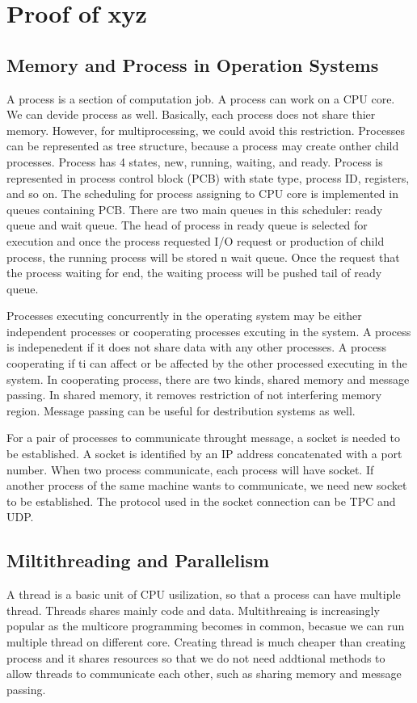 \chapter{Proof of xyz}
\label{appendix}
\thispagestyle{myheadings}

\section{Memory and Process in Operation Systems}
\label{sec:history}
A process is a section of computation job. A process can work on a CPU core. We can devide process as well.
Basically, each process does not share thier memory. However, for multiprocessing, we could avoid this restriction.
Processes can be represented as tree structure, because a process may create onther child processes.
Process has 4 states, new, running, waiting, and ready. 
Process is represented in process control block (PCB) with state type, process ID, registers, and so on.
The scheduling for process assigning to CPU core is implemented in queues containing PCB. There are two main queues in this scheduler: 
ready queue and wait queue. The head of process in ready queue is selected for execution and once the process requested I/O request or 
production of child process, the running process will be stored n wait queue. Once the request that the process waiting for end, 
the waiting process will be pushed tail of ready queue. 

Processes executing concurrently in the operating system may be either independent processes or cooperating processes excuting in the system.
A process is indepenedent if it does not share data with any other processes. A process cooperating if ti can affect or be affected by the 
other processed executing in the system. In cooperating process, there are two kinds, shared memory and message passing. 
In shared memory, it removes restriction of not interfering memory region. Message passing can be useful for destribution systems as well.

For a pair of processes to communicate throught message, a socket is needed to be established. 
A socket is identified by an IP address concatenated with a port number. When two process communicate, each process will have socket. 
If another process of the same machine wants to communicate, we need new socket to be established. The protocol used in the socket connection
can be TPC and UDP.

\section{Miltithreading and Parallelism}
\label{sec:history}
A thread is a basic unit of CPU usilization, so that a process can have multiple thread. Threads shares mainly code and data. 
Multithreaing is increasingly popular as the multicore programming becomes in common, becasue we can run multiple thread on different core.
Creating thread is much cheaper than creating process and it shares resources so that we do not need addtional methods to allow threads to 
communicate each other, such as sharing memory and message passing.


